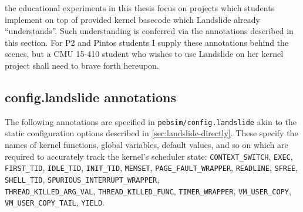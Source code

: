 the educational experiments in this thesis focus on projects which students implement
on top of provided kernel basecode which Landslide already ``understands''.
Such understanding is conferred via the annotations described in this section.
For P2 and Pintos students I supply these annotations behind the scenes,
but a CMU 15-410 student who wishes to use Landslide on her kernel project shall need to brave forth hereupon.


\subsection{config.landslide annotations}
\label{sec:landslide-config-landslide}

The following annotations are specified in {\tt pebsim/config.landslide} akin to the static configuration options
described in \cref{sec:landslide-directly}.
These specify the names of kernel functions, global variables, default values, and so on
which are required to accurately track the kernel's scheduler state:
{\tt CONTEXT\_SWITCH},
{\tt EXEC},
{\tt FIRST\_TID},
{\tt IDLE\_TID},
{\tt INIT\_TID},
{\tt MEMSET},
{\tt PAGE\_FAULT\_WRAPPER},
{\tt READLINE},
{\tt SFREE},
{\tt SHELL\_TID},
{\tt SPURIOUS\_INTERRUPT\_WRAPPER},
\\
{\tt THREAD\_KILLED\_ARG\_VAL},
{\tt THREAD\_KILLED\_FUNC},
{\tt TIMER\_WRAPPER},
{\tt VM\_USER\_COPY},
\\
{\tt VM\_USER\_COPY\_TAIL},
{\tt YIELD}.

